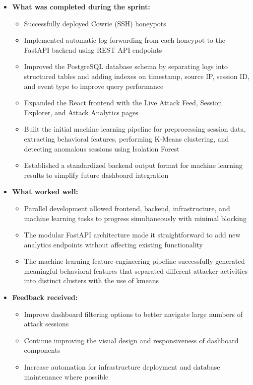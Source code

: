 \documentclass{article}
\begin{document}
\begin{itemize}
    \item \textbf{What was completed during the sprint:}
    \begin{itemize}
        \item Successfully deployed Cowrie (SSH) honeypots
        \item Implemented automatic log forwarding from each honeypot to the FastAPI backend using REST API endpoints
        \item Improved the PostgreSQL database schema by separating logs into structured tables and adding indexes on timestamp, source IP, session ID, and event type to improve query performance
        \item Expanded the React frontend with the Live Attack Feed, Session Explorer, and Attack Analytics pages 
        \item Built the initial machine learning pipeline for preprocessing session data, extracting behavioral features, performing K-Means clustering, and detecting anomalous sessions using Isolation Forest 
        \item Established a standardized backend output format for machine learning results to simplify future dashboard integration
    \end{itemize}

    \item \textbf{What worked well:}
    \begin{itemize}
        \item Parallel development allowed frontend, backend, infrastructure, and machine learning tasks to progress simultaneously with minimal blocking
        \item The modular FastAPI architecture made it straightforward to add new analytics endpoints without affecting existing functionality
        \item The machine learning feature engineering pipeline successfully generated meaningful behavioral features that separated different attacker activities into distinct clusters with the use of kmeans
    \end{itemize}

    \item \textbf{Feedback received:}
    \begin{itemize}
        \item Improve dashboard filtering options to better navigate large numbers of attack sessions
        \item Continue improving the visual design and responsiveness of dashboard components
        \item Increase automation for infrastructure deployment and database maintenance where possible
    \end{itemize}


\end{itemize}
\end{document}
